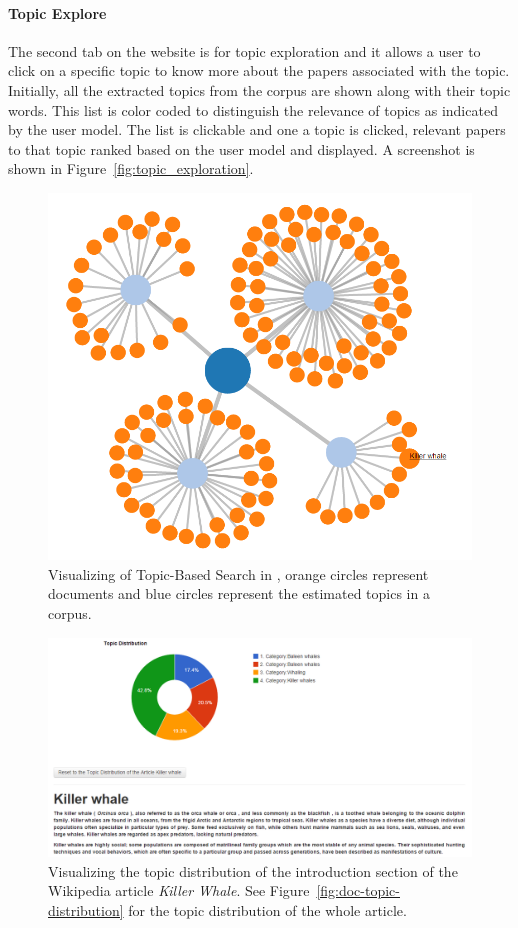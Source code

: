 \paragraph{Topic Explore} The second tab on the website is for topic exploration and it allows a user to click on a specific topic to know more about the papers associated with the topic.
Initially, all the extracted topics from the corpus are shown along with their topic words.
This list is color coded to distinguish the relevance of topics as indicated by the user model.
The list is clickable and one a topic is clicked, relevant papers to that topic ranked based on the user model and displayed.
A screenshot is shown in Figure~\ref{fig:topic_exploration}.

\begin{figure}[htb]\centering 
\includegraphics[width=.5\textwidth]{images/topical_docs.png}
\caption{Visualizing of Topic-Based Search in \system, orange 
circles represent documents and blue circles represent the estimated 
topics in a corpus.}
\label{fig:topic-search-viz}
\end{figure}

\begin{figure}[htb]\centering 
\includegraphics[width=1\textwidth]{images/para_topic_distribution.png}
\caption{Visualizing the topic distribution of the introduction 
section of the Wikipedia article \textit{Killer Whale}. See Figure~\ref{fig:doc-topic-distribution} for the topic distribution of 
the whole article.}
\label{fig:doc-word-counts}
\end{figure}

